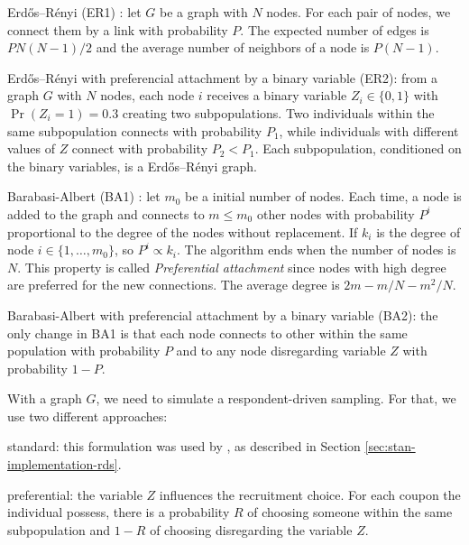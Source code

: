 \begin{alineas}
  \item Erdős–Rényi (ER1) \cite{erdos1960evolution}: let $G$ be a graph with $N$
  nodes. For each pair of nodes, we connect them by a link with probability
  $P$. The expected number of edges is $PN(N-1)/2$ and the average number of
  neighbors of a node is $P(N-1)$.
  \item Erdős–Rényi with preferencial attachment by a binary variable (ER2):
  from a graph $G$ with $N$ nodes, each
  node $i$ receives a binary variable $Z_i \in \{0,1\}$ with $\Pr(Z_i =
    1) = 0.3$ creating two subpopulations. Two individuals within the same
  subpopulation connects with probability $P_1$, while individuals with
  different values of $Z$ connect with probability $P_2 < P_1$. Each
  subpopulation, conditioned on the binary variables, is a Erdős–Rényi
  graph.
  \item Barabasi-Albert (BA1) \cite{barabasi1999emergence}: let $m_0$ be a
  initial number of nodes. Each time, a node is added to the graph and connects
  to $m \le m_0$ other nodes with probability $P^i$ proportional to the degree of
  the nodes without replacement. If $k_i$ is the degree of node $i \in \{1, \dots,
    m_0\}$, so $P^i \propto k_i$. The algorithm ends when the number of nodes
  is $N$. This property is called {\em Preferential attachment} since nodes
  with high degree are preferred for the new connections. The average degree
  is $2m - m/N - m^2/N$.
  \item Barabasi-Albert with preferencial attachment by a binary variable
  (BA2): the only change in BA1 is that each node connects to other within the
  same population with probability $P$ and to any node disregarding variable
  $Z$ with probability $1- P$.
\end{alineas}

With a graph $G$, we need to simulate a respondent-driven sampling. For that,
we use two different approaches:
\begin{alineas}
  \item standard: this formulation was used by \textcite[p.
    14670]{baraff2016estimating}, as described in Section
  \ref{sec:stan-implementation-rds}.
  \item preferential: the variable $Z$ influences the recruitment choice. For
  each coupon the individual possess, there is a probability $R$ of choosing
  someone within the same subpopulation and $1-R$ of choosing disregarding the
  variable $Z$.
\end{alineas}

